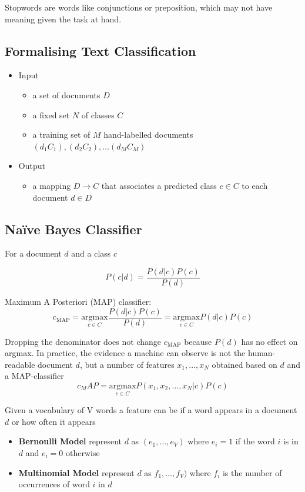 \documentclass[11pt]{article}
\begin{document}
Stopwords are words like conjunctions or preposition, which may not have meaning given the task at hand.

\subsection{Formalising Text Classification}

\begin{itemize}[label=]
	\item Input
	\begin{itemize}
		\item a set of documents $D$
		\item a fixed set $N$ of classes $C$
		\item a training set of $M$ hand-labelled documents $(d_1 C_1),(d_2 C_2), \dots (d_M C_M)$
	\end{itemize}
	\item Output
	\begin{itemize}
		\item a mapping $D\rightarrow C$ that associates a predicted class $c\in C$ to each document $d\in D$
	\end{itemize}
\end{itemize}

\subsection{Naïve Bayes Classifier}
For a document $d$ and a class $c$

\begin{equation*}
	P(c|d) = \frac{P(d|c)P(c)}{P(d)}
\end{equation*}

\noindent
Maximum A Posteriori (MAP) classifier:
\begin{equation*}
	c_{\text{MAP}} = \underset{c\in C}{\text{argmax}} \frac{P(d|c) P(c)}{P(d)} = \underset{c\in C}{\text{argmax}} P(d|c) P(c)
\end{equation*}

Dropping the denominator does not change $c_{\text{MAP}}$ because $P(d)$ has no effect on argmax. In practice, the evidence a machine can observe is not the human-readable document $d$, but a number of features $x_1,\dots,x_N$ obtained based on $d$ and a MAP-classifier
\begin{equation*}
	c_MAP = \underset{c\in C}{\text{argmax}} P(x_1, x_2, \dots , x_N | c) P(c)
\end{equation*}

\noindent
Given a vocabulary of V words a feature can be if a word appears in a document $d$ or how often it appears
\begin{itemize}
	\item \textbf{Bernoulli Model} represent $d$ as $(e_1, \dots, e_V)$ where $e_i =1$ if the word $i$ is in $d$ and $e_i = 0$ otherwise
	\item \textbf{Multinomial Model} represent $d$ as $f_1, \dots, f_V)$ where $f_i$ is the number of occurrences of word $i$ in $d$
\end{itemize}
\end{document}
